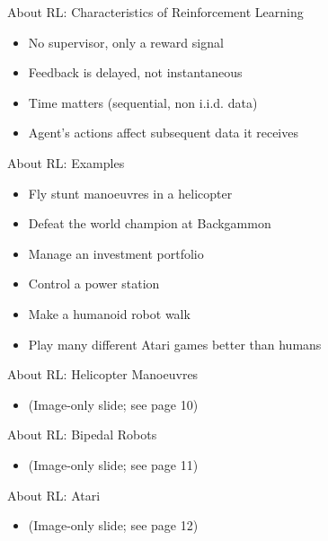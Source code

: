 \documentclass[presentation]{beamer}
\begin{document}
\begin{frame}[label={sec:org9268056}]{About RL: Characteristics of Reinforcement Learning}
\begin{itemize}
\item No supervisor, only a reward signal
\item Feedback is delayed, not instantaneous
\item Time matters (sequential, non i.i.d. data)
\item Agent’s actions affect subsequent data it receives
\end{itemize}
\end{frame}
\begin{frame}[label={sec:orga4ec700}]{About RL: Examples}
\begin{itemize}
\item Fly stunt manoeuvres in a helicopter
\item Defeat the world champion at Backgammon
\item Manage an investment portfolio
\item Control a power station
\item Make a humanoid robot walk
\item Play many different Atari games better than humans
\end{itemize}
\end{frame}
\begin{frame}[label={sec:org7ff7505}]{About RL: Helicopter Manoeuvres}
\begin{itemize}
\item (Image-only slide; see page 10)
\end{itemize}
\end{frame}
\begin{frame}[label={sec:org38dff0c}]{About RL: Bipedal Robots}
\begin{itemize}
\item (Image-only slide; see page 11)
\end{itemize}
\end{frame}
\begin{frame}[label={sec:orgf7eb1bb}]{About RL: Atari}
\begin{itemize}
\item (Image-only slide; see page 12)
\end{itemize}
\end{frame}
\end{document}
